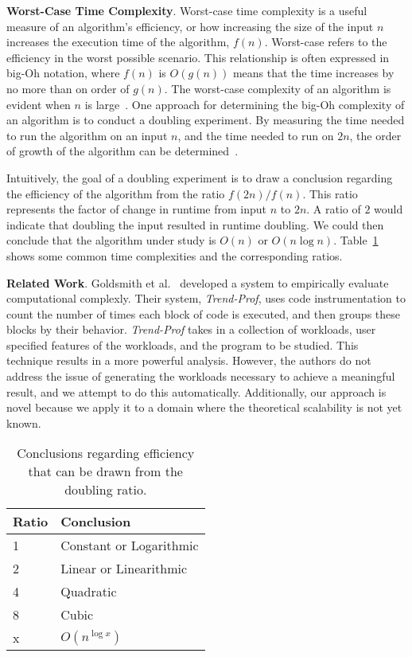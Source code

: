 {\bf Worst-Case Time Complexity}. Worst-case time complexity is a useful measure of an algorithm's efficiency, or how
increasing the size of the input $n$ increases the execution time of the algorithm, $f(n)$.  Worst-case refers to the
efficiency in the worst possible scenario.  This relationship is often expressed in big-Oh notation, where $f(n)$ is
$O(g(n))$ means that the time increases by no more than on order of $g(n)$. The worst-case complexity of an algorithm is
evident when $n$ is large~\cite{Goodrich2014}. One approach for determining the big-Oh complexity of an algorithm is to
conduct a doubling experiment. By measuring the time needed to run the algorithm on an input $n$, and the time needed to
run on $2n$, the order of growth of the algorithm can be determined~\cite{McGeoch2012,Sedgewick1998}.

Intuitively, the goal of a doubling experiment is to draw a conclusion regarding the efficiency of the algorithm from
the ratio $f(2n)/f(n)$. This ratio represents the factor of change in runtime from input $n$ to $2n$. A ratio of $2$
would indicate that doubling the input resulted in runtime doubling. We could then conclude that the algorithm under
study is $O(n)$ or $O(n\log n)$.  Table~\ref{table:ratios} shows some common time complexities and the corresponding
ratios.

{\bf Related Work}. Goldsmith et al.~\cite{Goldsmith2007} developed a system to empirically evaluate computational
complexly.  Their system, \textit{Trend-Prof}, uses code instrumentation to count the number of times each block of code
is executed, and then groups these blocks by their behavior.  \textit{Trend-Prof} takes in a collection of workloads,
user specified features of the workloads, and the program to be studied. This technique results in a more powerful
analysis. However, the authors do not address the issue of generating the workloads necessary to achieve a meaningful
result, and we attempt to do this automatically.  Additionally, our approach is novel because we apply it to a domain
where the theoretical scalability is not yet known.

\begin{table}[t]

  \begin{center}
    \begin{tabular}{l|l}
      Ratio & Conclusion              \\ \hline
      1     & Constant or Logarithmic \\
      2     & Linear or Linearithmic  \\
      4     & Quadratic               \\
      8     & Cubic                   \\
      x     & $O(n^{\log x})$
    \end{tabular}
  \end{center}
  \vspace*{-.15in}

  \caption{Conclusions regarding efficiency that can be drawn from the doubling ratio.}\label{table:ratios}
  \vspace*{-.30in}

\end{table}
